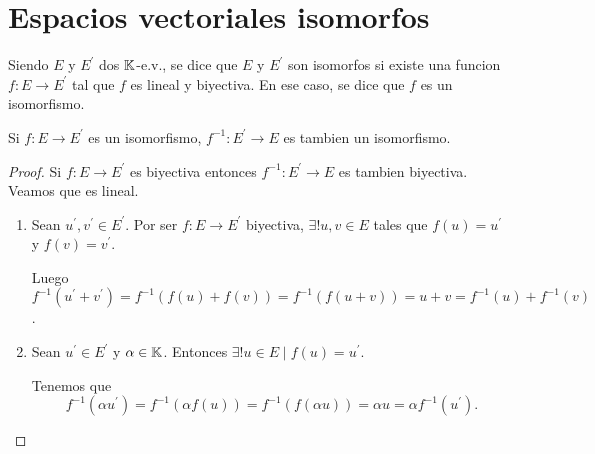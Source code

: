 \section{Espacios vectoriales isomorfos}
\begin{definition}
	Siendo \(E \) y \(E^\prime  \) dos \(\mathbb{K} \)-e.v., se dice que \(E \) y \(E^\prime  \) son isomorfos si existe una funcion \(f \colon E \to E^\prime \) tal que \(f \) es lineal y biyectiva. En ese caso, se dice que \( f \) es un isomorfismo.
\end{definition}
\begin{proposition}
	Si \(f \colon E \to E^\prime  \) es un isomorfismo, \(f^{-1} \colon E^\prime \to E \) es tambien un isomorfismo.
\end{proposition}
\begin{proof}
	Si \(f\colon E \to E^\prime  \) es biyectiva entonces \(f^{-1} \colon E^\prime \to E \) es tambien biyectiva. Veamos que es lineal.

	\begin{enumerate}
		\item Sean \(u^\prime, v^\prime \in E^\prime \). Por ser \(f \colon E \to E^\prime  \) biyectiva, \(\exists ! u,v \in E \) tales que \(f(u) = u^\prime \) y \(f(v) = v^\prime \).

		      Luego \(f^{-1} (u^\prime +v^\prime ) = f^{-1} (f(u) + f(v)) = f^{-1} (f(u + v)) =  u + v = f^{-1} (u) + f^{-1} (v)\).
		\item Sean \(u^\prime \in E^\prime  \) y \(\alpha \in \mathbb{K} \). Entonces \(\exists ! u \in E \mid f(u) = u^\prime  \).

		      Tenemos que
		      \[
			      f^{-1}(\alpha u^\prime ) = f^{-1} (\alpha f(u)) = f^{-1} (f(\alpha u)) = \alpha u = \alpha f^{-1} (u^\prime ).
		      \]
	\end{enumerate}
\end{proof}

